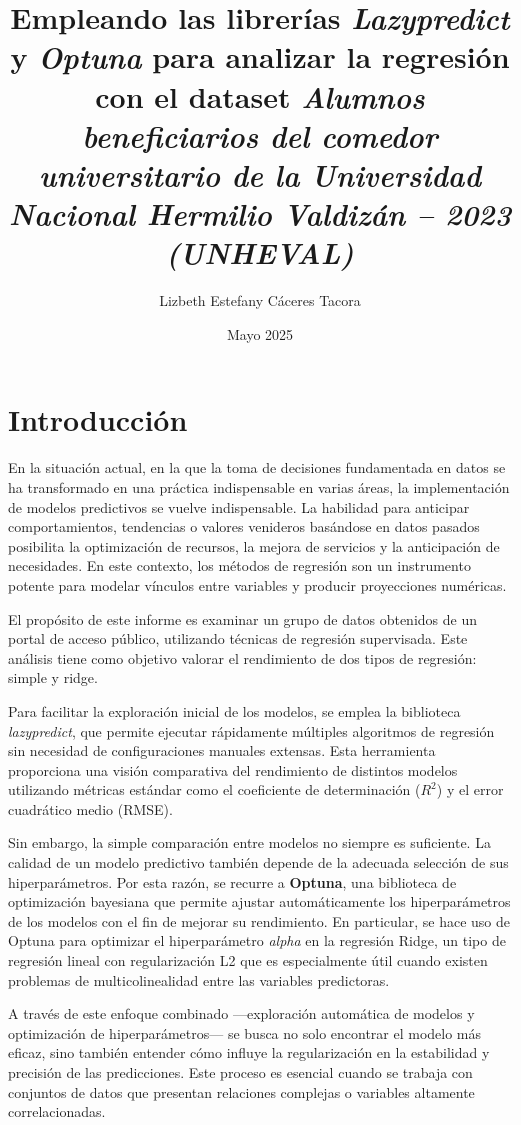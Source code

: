\documentclass{article}
\title{Empleando las librerías \textit{Lazypredict} y \textit{Optuna} para analizar la regresión con el dataset \textit{Alumnos beneficiarios del comedor universitario de la Universidad Nacional Hermilio Valdizán – 2023 (UNHEVAL)}}
\author{Lizbeth Estefany Cáceres Tacora}
\date{Mayo 2025}
\begin{document}
\maketitle
\section{Introducción}

En la situación actual, en la que la toma de decisiones fundamentada en datos se ha transformado en una práctica indispensable en varias áreas, la implementación de modelos predictivos se vuelve indispensable.  La habilidad para anticipar comportamientos, tendencias o valores venideros basándose en datos pasados posibilita la optimización de recursos, la mejora de servicios y la anticipación de necesidades.  En este contexto, los métodos de regresión son un instrumento potente para modelar vínculos entre variables y producir proyecciones numéricas.

 El propósito de este informe es examinar un grupo de datos obtenidos de un portal de acceso público, utilizando técnicas de regresión supervisada.  Este análisis tiene como objetivo valorar el rendimiento de dos tipos de regresión: simple y ridge.

Para facilitar la exploración inicial de los modelos, se emplea la biblioteca \textit{lazypredict}, que permite ejecutar rápidamente múltiples algoritmos de regresión sin necesidad de configuraciones manuales extensas. Esta herramienta proporciona una visión comparativa del rendimiento de distintos modelos utilizando métricas estándar como el coeficiente de determinación ($R^2$) y el error cuadrático medio (RMSE).

Sin embargo, la simple comparación entre modelos no siempre es suficiente. La calidad de un modelo predictivo también depende de la adecuada selección de sus hiperparámetros. Por esta razón, se recurre a \textbf{Optuna}, una biblioteca de optimización bayesiana que permite ajustar automáticamente los hiperparámetros de los modelos con el fin de mejorar su rendimiento. En particular, se hace uso de Optuna para optimizar el hiperparámetro \textit{alpha} en la regresión Ridge, un tipo de regresión lineal con regularización L2 que es especialmente útil cuando existen problemas de multicolinealidad entre las variables predictoras.

A través de este enfoque combinado —exploración automática de modelos y optimización de hiperparámetros— se busca no solo encontrar el modelo más eficaz, sino también entender cómo influye la regularización en la estabilidad y precisión de las predicciones. Este proceso es esencial cuando se trabaja con conjuntos de datos que presentan relaciones complejas o variables altamente correlacionadas.
\end{document}
